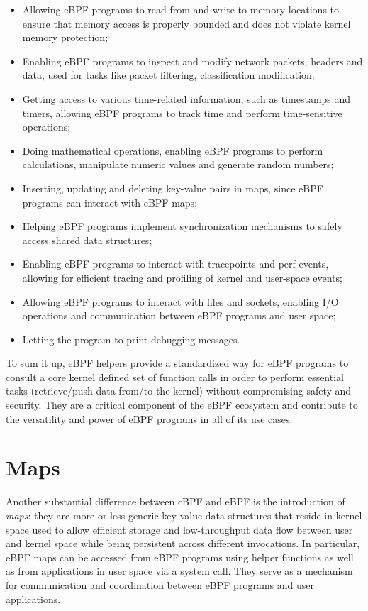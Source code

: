 \begin{itemize}
	\item 
		Allowing eBPF programs to read from and write to memory locations to ensure that memory access is properly bounded and does not violate kernel memory protection;
	\item 
		Enabling eBPF programs to inspect and modify network packets, headers and data, used for tasks like packet filtering, classification modification;
	\item 
		Getting access to various time-related information, such as timestamps and timers, allowing eBPF programs to track time and perform time-sensitive operations;
	\item 
		Doing mathematical operations, enabling eBPF programs to perform calculations, manipulate numeric values and generate random numbers;
	\item 
		Inserting, updating and deleting key-value pairs in maps, since eBPF programs can interact with eBPF maps;
	\item 
		Helping eBPF programs implement synchronization mechanisms to	safely access shared data structures;
	\item 
		Enabling eBPF programs to interact with tracepoints and perf events, allowing for efficient tracing and profiling of kernel and user-space events;
	\item 
		Allowing eBPF programs to interact with files and sockets, enabling I/O operations and communication between eBPF programs and user space;
	\item 
		Letting the program to print debugging messages.
\end{itemize}

To sum it up, eBPF helpers provide a standardized way for eBPF programs to consult a core kernel defined set of function calls in order to perform essential tasks (retrieve/push data from/to the kernel) without compromising safety and security. 
They are a critical component of the eBPF ecosystem and contribute to the versatility and power of eBPF programs in all of its use cases.

\section{Maps}

Another substantial difference between cBPF and eBPF is the introduction of \textit{maps}: they are more or less generic key-value data structures that reside in kernel space used to 
allow efficient storage and low-throughput data flow between user and kernel space while being persistent across different invocations.
In particular, eBPF maps can be accessed from eBPF programs using helper functions as well as from applications in user space via a system call.
They serve as a mechanism for communication and coordination between eBPF programs and user applications.

